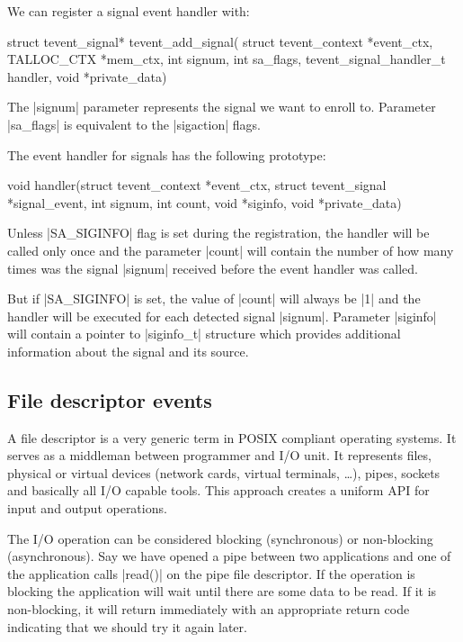 \noindent
We can register a signal event handler with:

\begin{funcproto}
struct tevent_signal* tevent_add_signal(
             struct tevent_context *event_ctx,
             TALLOC_CTX *mem_ctx,
             int signum, int sa_flags,
             tevent_signal_handler_t handler,
             void *private_data)   
\end{funcproto}
\begin{funcdesc}
The |signum| parameter represents the signal we want to enroll to.
Parameter |sa_flags| is equivalent to the |sigaction| flags.
\end{funcdesc}
\funclistend
The event handler for signals has the following prototype:

\begin{funcproto}
void handler(struct tevent_context *event_ctx,
             struct tevent_signal *signal_event,
             int signum, int count, void *siginfo,
             void *private_data)
\end{funcproto}
\funclistend
Unless |SA_SIGINFO| flag is set during the registration, the handler will be
called only once and the parameter |count| will contain the number of how many
times was the signal |signum| received before the event handler was called.

But if |SA_SIGINFO| is set, the value of |count| will always be |1| and the
handler will be executed for each detected signal |signum|. Parameter |siginfo|
will contain a pointer to |siginfo_t| structure which provides additional
information about the signal and its source.

\subsection{File descriptor events}

A file descriptor is a very generic term in POSIX compliant operating
systems. It serves as a middleman between programmer and I/O unit. It
represents files, physical or virtual devices (network cards, virtual
terminals, \ldots), pipes, sockets and basically all I/O capable tools. This
approach creates a uniform API for input and output operations.

The I/O operation can be considered blocking (synchronous) or non-blocking
(asynchronous). Say we have opened a pipe between two applications and one of
the application calls |read()| on the pipe file descriptor. If the operation is
blocking the application will wait until there are some data to be read. If it
is non-blocking, it will return immediately with an appropriate return code
indicating that we should try it again later.

